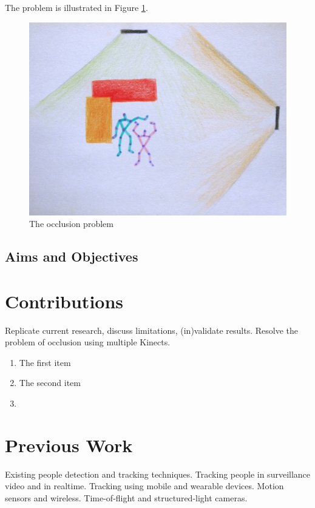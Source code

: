\documentclass{sigchi}
\begin{document}
The problem is illustrated in Figure \ref{fig:occlusion_problem}.

\begin{figure}[!h]
  \centering
  \includegraphics[width=0.9\columnwidth]{occlusion_problem}
  \caption{The occlusion problem}
  \label{fig:occlusion_problem}
\end{figure}

\subsection{Aims and Objectives}

\section{Contributions}

Replicate current research, discuss limitations, (in)validate results. Resolve the problem of occlusion using multiple Kinects. 

\begin{enumerate}
  \item The first item
  \item The second item
  \item 
\end{enumerate}

\section{Previous Work}

Existing people detection and tracking techniques. Tracking people in surveillance video and in realtime. Tracking using mobile and wearable devices. Motion sensors and wireless. Time-of-flight and structured-light cameras.
\end{document}
